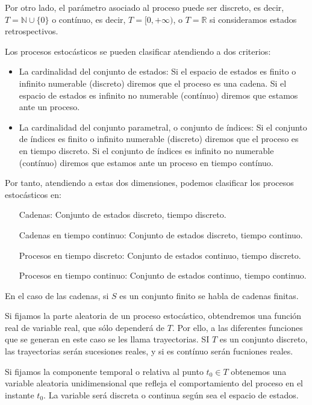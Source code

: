 Por otro lado, el par\'ametro asociado al proceso puede ser discreto, es decir, $T=\mathbb{N}\cup \{0\}$ o cont\'inuo, es decir, $T=[0,+\infty)$, o $T=\mathbb{R}$ si consideramos estados retrospectivos.

Los procesos estoc\'asticos se pueden clasificar atendiendo a dos criterios:
\begin{itemize}
\item La cardinalidad del conjunto de estados: Si el espacio de estados es finito o infinito numerable (discreto) diremos que el proceso es una cadena. Si el espacio de estados es infinito no numerable (cont\'inuo) diremos que estamos ante un proceso.
\item La cardinalidad del conjunto parametral, o conjunto de \'indices: Si el conjunto de \'indices es finito o infinito numerable (discreto) diremos que el proceso es en tiempo discreto. Si el conjunto de \'indices es infinito no numerable (cont\'inuo) diremos que estamos ante un proceso en tiempo cont\'inuo.
\end{itemize}

Por tanto, atendiendo a estas dos dimensiones, podemos clasificar los procesos estoc\'asticos en:
\begin{enumerate}
\item[Cadenas:] Conjunto de estados discreto, tiempo discreto.
\item[Cadenas en tiempo continuo:] Conjunto de estados discreto, tiempo continuo.
\item[Procesos en tiempo discreto:] Conjunto de estados continuo, tiempo discreto.
\item[Procesos en tiempo continuo:] Conjunto de estados continuo, tiempo continuo.
\end{enumerate}

En el caso de las cadenas, si $S$ es un conjunto finito se habla de cadenas finitas.

Si fijamos la parte aleatoria de un proceso estoc\'astico, obtendremos una funci\'on real de variable real, que s\'olo depender\'a de $T$. Por ello, a las diferentes funciones que se generan en este caso se les llama trayectorias. SI $T$ es un conjunto discreto, las trayectorias ser\'an sucesiones reales, y si es cont\'inuo ser\'an fucniones reales.

Si fijamos la componente temporal o relativa al punto $t_0\in T$ obtenemos una variable aleatoria unidimensional que refleja el comportamiento del proceso en el instante $t_0$. La variable ser\'a discreta o continua seg\'un sea el espacio de estados.

